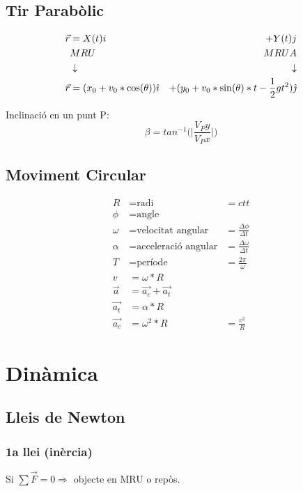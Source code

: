 \subsection{Tir Parabòlic}
\begin{align}\label{Tir Parabolic}
    \vec{r} &= X(t)i & + Y(t)j \notag \\
    & MRU &  MRUA \notag \\
    & \downarrow  & \downarrow \notag \\
    \vec{r} &= (x_0+v_0*\cos(\theta)) \hat{\imath} & + (y_0 + v_0*\sin(\theta)*t - \frac{1}{2}gt^2) \hat{\jmath}
\end{align}

Inclinació en un punt P:
\begin{equation}\label{eqi:Inclinacio tir parabolic}
    \beta = tan^{-1}\bigg(\bigg|\frac{V_Py}{V_Px}\bigg|\bigg)
\end{equation}

\subsection{Moviment Circular}
\begin{align*}
    R &= \text{radi} &= ctt \\
    \phi &= \text{angle} \\
    \omega &= \text{velocitat angular} &= \frac{\Delta \phi}{\Delta t} \\
    \alpha &= \text{acceleració angular} &= \frac{\Delta \omega}{\Delta t} \\
    T &= \text{període} &= \frac{2\pi}{\omega} \\
    v &= \omega * R \\
    \vec{a} &= \vec{a_c} + \vec{a_t} \\
    \vec{a_t} &= \alpha * R \\
    \vec{a_c} &= \omega^2*R &= \frac{v^2}{R}
\end{align*}

\section{Dinàmica}
\label{sec:dinamica}

\subsection{Lleis de Newton}
\subsubsection{1a llei (inèrcia)}
\begin{center}
    Si $\sum \vec{F} = 0 \Rightarrow$ objecte en MRU o repòs.
\end{center}

